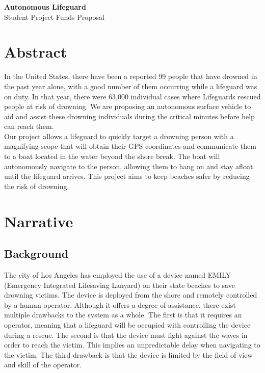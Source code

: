 \documentclass[11pt]{article}
\begin{document}
\begin{center} 
{
    {\Large \textbf{Autonomous Lifeguard}}\\
  	{\large Student Project Funds Proposal}
}
\end{center}

\section*{Abstract}
In the United States, there have been a reported 99 people that have drowned in the past year alone, with a good number of them occurring while a lifeguard was on duty. In that year, there were 63,000 individual cases where Lifeguards rescued people at risk of drowning. We are proposing an autonomous surface vehicle to aid and assist these drowning individuals during the critical minutes before help can reach them.\\

Our project allows a lifeguard to quickly target a drowning person with a magnifying scope that will obtain their GPS coordinates and communicate them to a boat located in the water beyond the shore break. The boat will autonomously navigate to the person, allowing them to hang on and stay afloat until the lifeguard arrives. This project aims to keep beaches safer by reducing the risk of drowning. 


\section*{Narrative}

\subsection*{Background}
The city of Los Angeles has employed the use of a device named EMILY (Emergency Integrated Lifesaving Lanyard) on their state beaches to save drowning victims. The device is deployed from the shore and remotely controlled by a human operator. Although it offers a degree of assistance, there exist multiple drawbacks to the system as a whole. The first is that it requires an operator, meaning that a lifeguard will be occupied with controlling the device during a rescue. The second is that the device must fight against the waves in order to reach the victim. This implies an unpredictable delay when navigating to the victim. The third drawback is that the device is limited by the field of view and skill of the operator.\\
\end{document}
